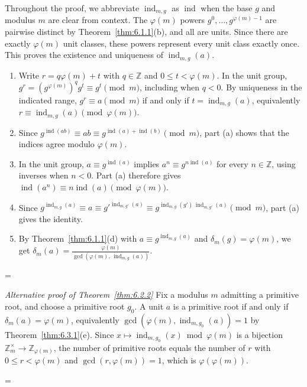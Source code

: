 \documentclass[11pt]{article}
\makeatletter
\theoremstyle{ntstyle}
\let\nt@closedisplay\]
\def\nt@guardedclose{\@ifnextchar\par{\nt@closeafterpar}{\@ifnextchar\end{\postdisplaypenalty\@M\nt@closedisplay}{\nt@closedisplay}}}
\def\nt@closeafterpar\par{\@ifnextchar\par{\nt@closeafterpar}{\@ifnextchar\end{\postdisplaypenalty\@M\nt@closedisplay\par}{\nt@closedisplay\par}}}
\renewenvironment{proof}[1][\proofname]{\par
  \pushQED{\qed}\normalfont\topsep\medskipamount\edef\nt@afterproof{\@endparpenalty=\the\@endparpenalty\relax}\@beginparpenalty\@M\@endparpenalty\@M\let\]\nt@guardedclose\trivlist\item[]\textit{#1\@addpunct{.}} \ignorespaces}{\ifvmode\addpenalty\@M\fi\popQED\nt@afterproof\endtrivlist\@endpefalse}
\newenvironment{altproof}[1][\proofname]{\begin{proof}[#1]\renewcommand{\qedsymbol}{}}{\end{proof}}
\newcommand{\ZmodUnits}[1]{\mathbb{Z}_{#1}^{\times}}
\DeclareMathOperator{\ind}{ind}
\makeatother
\begin{document}
\begin{proof} Throughout the proof, we abbreviate
	$\ind_{m,g}$ as $\ind$ when the base $g$
	and modulus $m$ are clear from context. The
	$\varphi(m)$ powers $g^{0},\ldots,g^{\varphi(m)-1}$ are pairwise
	distinct by Theorem~\ref{thm:6.1.1}(b), and all are units. Since there
	are exactly $\varphi(m)$ unit classes, these powers represent every
	unit class exactly once. This proves the existence and uniqueness of
	$\ind_{m,g}(a)$.

	\begin{enumerate}[label={\alph*)}]
		\item Write $r=q\varphi(m)+t$ with $q\in\mathbb{Z}$ and
		      $0\le t<\varphi(m)$. In the unit group,
		      $g^r=(g^{\varphi(m)})^qg^t\equiv g^t\pmod m$,
		      including when $q<0$. By uniqueness in the indicated range,
		      $g^r\equiv a\pmod m$ if and only if $t=\ind_{m,g}(a)$,
		      equivalently $r\equiv\ind_{m,g}(a)\pmod{\varphi(m)}$.
		\item Since $g^{\ind(ab)} \equiv ab \equiv
			      g^{\ind(a) + \ind(b)} \pmod{m}$, part (a) shows that the indices
		      agree modulo $\varphi(m)$.
		\item In the unit group, $a\equiv g^{\ind(a)}$ implies
		      $a^n\equiv g^{n\ind(a)}$ for every $n\in\mathbb{Z}$,
		      using inverses when $n<0$. Part (a) therefore gives
		      $\ind(a^n)\equiv n\ind(a)\pmod{\varphi(m)}$.
		\item Since $g^{\ind_{m,g}(a)} \equiv a \equiv
			      g'^{\ind_{m,g'}(a)} \equiv
			      g^{\ind_{m,g}(g')\, \ind_{m,g'}(a)} \pmod{m}$,
		      part (a) gives the identity.
		\item By Theorem~\ref{thm:6.1.1}(d) with $a \equiv
			      g^{\ind_{m,g}(a)}$ and $\delta_m(g) = \varphi(m)$,
		      we get $\delta_m(a) = \frac{\varphi(m)}{\gcd(\varphi(m), \, \ind_{m,g}(a))}$.
	\end{enumerate}

\end{proof}
\begin{altproof}[Alternative proof of Theorem~\ref{thm:6.2.2}] Fix a modulus $m$ admitting a primitive root, and choose
	a primitive root $g_0$. A unit $a$ is a primitive root if and only if
	$\delta_m(a)=\varphi(m)$, equivalently
	$\gcd(\varphi(m),\ind_{m,g_0}(a))=1$ by Theorem~\ref{thm:6.3.1}(e). Since
	$x\mapsto\ind_{m,g_0}(x)\bmod\varphi(m)$ is a
	bijection $\ZmodUnits{m}\to\mathbb{Z}_{\varphi(m)}$, the
	number of primitive roots equals the number of $r$ with $0 \le r <
		\varphi(m)$ and $\gcd(r, \varphi(m)) = 1$, which is $\varphi(\varphi(m))$.

\end{altproof}
\end{document}
